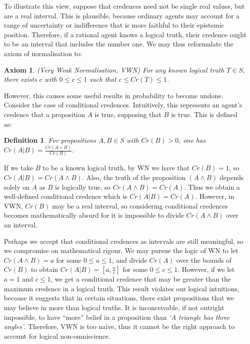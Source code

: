 \documentclass[12pt]{article}
\newtheorem{definition}{Definition}
\newtheorem{axiom}{Axiom}
\begin{document}
To illustrate this view, suppose that credences need not be single real values, but are a real interval. This is plausible, because ordinary agents may account for a range of uncertainty or indifference that is more faithful to their epistemic position. Therefore, if a rational agent knows a logical truth, their credence ought to be an interval that includes the number one.\autocite{sep} We may thus reformulate the axiom of normalisation to:
\begin{axiom}
    (Very Weak Normalisation, VWN) For any known logical truth $T\in S$, there exists $c$ with $0\leq c\leq 1$ such that $c\leq Cr(T)\leq1$.
\end{axiom}
However, this causes some useful results in probability to become undone. Consider the case of conditional credences. Intuitively, this represents an agent's credence that a proposition $A$ is true, supposing that $B$ is true.\autocite[32]{bdrc} This is defined as:
\begin{definition}
    For propositions $A,B\in S$ with $Cr(B)>0$, one has $Cr(A|B)=\frac{Cr(A\land B)}{Cr(B)}$.
\end{definition}
If we take $B$ to be a known logical truth, by WN we have that $Cr(B)=1$, so $Cr(A|B)=Cr(A\land B)$. Also, the truth of the proposition $(A\land B)$ depends solely on $A$ as $B$ is logically true, so $Cr(A\land B)=Cr(A)$. Thus we obtain a well-defined conditional credence which is $Cr(A|B)=Cr(A)$. However, in VWN, $Cr(B)$ may be a real interval, so considering conditional credences becomes mathematically absurd for it is impossible to divide $Cr(A\land B)$ over an interval.

Perhaps we accept that conditional credences as intervals are still meaningful, so we compromise on mathematical rigour. We may pursue the logic of WN to let $Cr(A\land B)=a$ for some $0\leq a\leq1$, and divide $Cr(A)$ over the bounds of $Cr(B)$ to obtain $Cr(A|B)=[a,\frac{a}{c}]$ for some $0\leq c\leq1$. However, if we let $a=1$ and $c\leq 1$, we get a conditional credence that may be greater than the maximum credence in a logical truth. This result violates our logical intuitions, because it suggests that in certain situations, there exist propositions that we may believe in more than logical truths. It is inconceivable, if not outright impossible, to have ``more'' belief in a proposition than \textit{`A triangle has three angles'}. Therefore, VWN is too na\"ive, thus it cannot be the right approach to account for logical non-omniscience.
\end{document}
